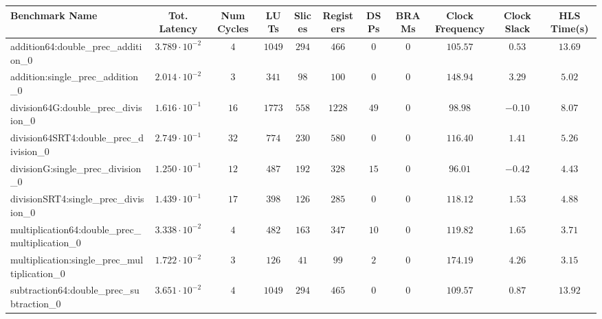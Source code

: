\begin{tabular}{|l|c|c|c|c|c|c|c|c|c|c|}
\hline
Benchmark Name                                   & Tot. Latency            & Num Cycles & LUTs     & Slices   & Registers & DSPs   & BRAMs & Clock Frequency & Clock Slack & HLS Time(s) \\
\hline
addition64:double\_prec\_addition\_0             & $ 3.789 \cdot 10^{-2} $ & $ 4      $ & $ 1049 $ & $ 294  $ & $ 466   $ & $ 0  $ & $ 0 $ & $ 105.57      $ & $ 0.53    $ & $ 13.69   $ \\
addition:single\_prec\_addition\_0               & $ 2.014 \cdot 10^{-2} $ & $ 3      $ & $ 341  $ & $ 98   $ & $ 100   $ & $ 0  $ & $ 0 $ & $ 148.94      $ & $ 3.29    $ & $ 5.02    $ \\
division64G:double\_prec\_division\_0            & $ 1.616 \cdot 10^{-1} $ & $ 16     $ & $ 1773 $ & $ 558  $ & $ 1228  $ & $ 49 $ & $ 0 $ & $ 98.98       $ & $ -0.10   $ & $ 8.07    $ \\
division64SRT4:double\_prec\_division\_0         & $ 2.749 \cdot 10^{-1} $ & $ 32     $ & $ 774  $ & $ 230  $ & $ 580   $ & $ 0  $ & $ 0 $ & $ 116.40      $ & $ 1.41    $ & $ 5.26    $ \\
divisionG:single\_prec\_division\_0              & $ 1.250 \cdot 10^{-1} $ & $ 12     $ & $ 487  $ & $ 192  $ & $ 328   $ & $ 15 $ & $ 0 $ & $ 96.01       $ & $ -0.42   $ & $ 4.43    $ \\
divisionSRT4:single\_prec\_division\_0           & $ 1.439 \cdot 10^{-1} $ & $ 17     $ & $ 398  $ & $ 126  $ & $ 285   $ & $ 0  $ & $ 0 $ & $ 118.12      $ & $ 1.53    $ & $ 4.88    $ \\
multiplication64:double\_prec\_multiplication\_0 & $ 3.338 \cdot 10^{-2} $ & $ 4      $ & $ 482  $ & $ 163  $ & $ 347   $ & $ 10 $ & $ 0 $ & $ 119.82      $ & $ 1.65    $ & $ 3.71    $ \\
multiplication:single\_prec\_multiplication\_0   & $ 1.722 \cdot 10^{-2} $ & $ 3      $ & $ 126  $ & $ 41   $ & $ 99    $ & $ 2  $ & $ 0 $ & $ 174.19      $ & $ 4.26    $ & $ 3.15    $ \\
subtraction64:double\_prec\_subtraction\_0       & $ 3.651 \cdot 10^{-2} $ & $ 4      $ & $ 1049 $ & $ 294  $ & $ 465   $ & $ 0  $ & $ 0 $ & $ 109.57      $ & $ 0.87    $ & $ 13.92   $ \\

\end{tabular}
